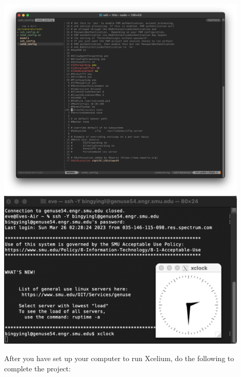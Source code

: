 \documentclass[12pt]{article}
\newenvironment{sol}[1][Solution]{\begin{trivlist}\item[\hskip\labelsep {\bfseries #1:}]}{\end{trivlist}}
\begin{document}
\begin{enumerate}
\begin{sol}
\begin{center}
        \includegraphics[width=0.9\textwidth]{2.png}
        \includegraphics[width=0.9\textwidth]{3.png}
        \end{center}
    \end{sol}

\end{enumerate}
    After you have set up your computer to run Xcelium, do the following to complete the project:
\end{document}

